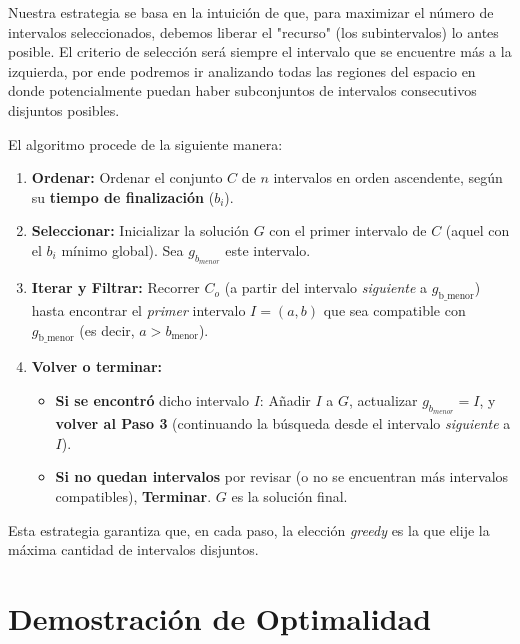 \documentclass[12pt, a4paper]{article}
\begin{document}
Nuestra estrategia se basa en la intuición de que, para maximizar el número de intervalos seleccionados, 
debemos liberar el "recurso" (los subintervalos) lo antes posible.
El criterio de selección será siempre el intervalo que se encuentre más a la izquierda, por ende podremos ir 
analizando todas las regiones del espacio en donde potencialmente puedan haber subconjuntos de 
intervalos consecutivos disjuntos posibles.


El algoritmo procede de la siguiente manera:

\begin{enumerate}
    \item \textbf{Ordenar:} Ordenar el conjunto $C$ de $n$ intervalos en orden ascendente, según su \textbf{tiempo de finalización} ($b_i$).
    
    \item \textbf{Seleccionar:} Inicializar la solución $G$ con el primer intervalo de $C$ (aquel con el $b_i$ mínimo global). Sea $g_{\text{$b_{menor}$}}$ este intervalo.
    
    \item \textbf{Iterar y Filtrar:} Recorrer $C_o$ (a partir del intervalo \textit{siguiente} a $g_{\text{b\_menor}}$) 
    hasta encontrar el \textit{primer} intervalo $I = (a, b)$ que sea compatible con 
    $g_{\text{b\_menor}}$ (es decir, $a > b_{\text{menor}}$).
    
    \item \textbf{Volver o terminar:}
    \begin{itemize}
        \item \textbf{Si se encontró} dicho intervalo $I$: Añadir $I$ a $G$, actualizar $g_{\text{$b_{menor}$}} = I$, y \textbf{volver al Paso 3} (continuando la búsqueda desde el intervalo \textit{siguiente} a $I$).
        \item \textbf{Si no quedan intervalos} por revisar (o no se encuentran más intervalos compatibles), \textbf{Terminar}. $G$ es la solución final.
    \end{itemize}
\end{enumerate}

Esta estrategia garantiza que, en cada paso, la elección \textit{greedy} es la que elije la máxima cantidad 
de intervalos disjuntos.

\section{Demostración de Optimalidad}
\end{document}
